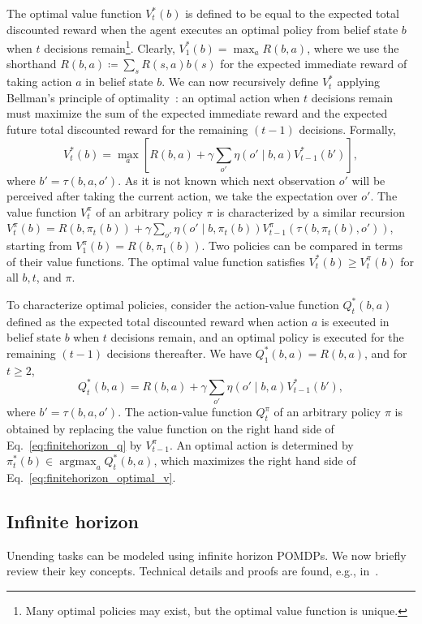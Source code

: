 \documentclass[journal]{IEEEtran}
\DeclareMathOperator*{\argmax}{argmax}
\begin{document}
The optimal value function $V_t^*(b)$ is defined to be equal to the expected {total discounted reward} when the agent executes an optimal policy from belief state $b$ when $t$ decisions remain\footnote{Many optimal policies may exist, but the optimal value function is unique.}.
Clearly, $V_1^*(b) = \max_a R(b,a)$, where we use the
%
shorthand {$R(b,a) \coloneqq \sum_s R(s,a)b(s)$} for the expected
immediate reward of taking action $a$ in belief state $b$.
We can now recursively define $V_t^*$ applying Bellman's principle of optimality~\cite{bellman1966dynamic}: an optimal action when $t$ decisions remain must maximize the sum of the expected immediate reward and the expected future {total discounted reward} for the remaining $(t-1)$ decisions.
Formally,
\begin{equation}
    \label{eq:finitehorizon_optimal_v}
    V_t^*(b) = \max\limits_{a}\left[R(b,a) + \gamma\sum\limits_{o'}\eta(o'\mid b,a)V_{t-1}^*(b') \right],
\end{equation}
where $b' = \tau(b,a,o')$.
As it is not known which next observation $o'$ will be perceived after taking the current action, we take the expectation over $o'$.
The value function $V_t^\pi$ of an arbitrary policy $\pi$ is characterized by a similar recursion $V_t^\pi(b) = R(b,\pi_t(b)) + \gamma\sum_{o'}\eta(o'\mid b,\pi_t(b))V_{t-1}^{\pi}(\tau(b,\pi_t(b),o'))$, starting from $V_1^\pi(b) = R(b,\pi_1(b))$.
Two policies can be compared in terms of their value functions.
The optimal value function satisfies $V_t^*(b) \geq V_t^{\pi}(b)$ for all $b, t$, and $\pi$.

To characterize optimal policies, consider the action-value function $Q_t^*(b,a)$ defined as the expected {total discounted reward} when action $a$ is executed in belief state $b$ when $t$ {decisions} remain, and an optimal policy is executed for the remaining $(t-1)$ decisions thereafter.
We have $Q_1^*(b,a) = R(b,a)$, and for $t\geq 2$,
\begin{equation}
    \label{eq:finitehorizon_q}
    Q_t^*(b,a) = R(b,a) + \gamma\sum\limits_{o'}\eta(o'\mid b,a)V_{t-1}^*(b'),
\end{equation}
where $b' = \tau(b,a,o')$.
The action-value function $Q_t^\pi$ of an arbitrary policy $\pi$ is obtained {by} replacing the value function on the right hand side of Eq.~\eqref{eq:finitehorizon_q} by $V_{t-1}^\pi$.
An optimal action is determined by $\pi_t^*(b) \in \argmax_{a} Q_t^*(b,a)$, which maximizes the right hand side of Eq.~\eqref{eq:finitehorizon_optimal_v}.

\subsection{Infinite horizon}
\label{subsec:infinite_horizon}
{Unending tasks can be modeled using} infinite horizon POMDPs.
{We now briefly review their key concepts.}
%
Technical details and proofs are found, e.g., in~\cite{hauskrecht2000value,puterman1994markov}.
\end{document}
